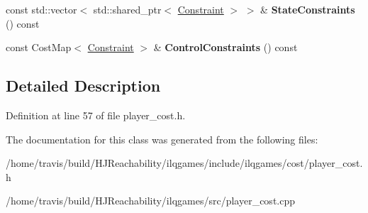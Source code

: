 \begin{DoxyCompactItemize}
\item 
const std\+::vector$<$ std\+::shared\+\_\+ptr$<$ \hyperlink{classilqgames_1_1_constraint}{Constraint} $>$ $>$ \& {\bfseries State\+Constraints} () const \hypertarget{classilqgames_1_1_player_cost_ac6ef894e71fd9524bd6aa6d3982f415a}{}\label{classilqgames_1_1_player_cost_ac6ef894e71fd9524bd6aa6d3982f415a}

\item 
const Cost\+Map$<$ \hyperlink{classilqgames_1_1_constraint}{Constraint} $>$ \& {\bfseries Control\+Constraints} () const \hypertarget{classilqgames_1_1_player_cost_acf0081bb561f71522cd9716a9e34eb60}{}\label{classilqgames_1_1_player_cost_acf0081bb561f71522cd9716a9e34eb60}

\end{DoxyCompactItemize}


\subsection{Detailed Description}


Definition at line 57 of file player\+\_\+cost.\+h.



The documentation for this class was generated from the following files\+:\begin{DoxyCompactItemize}
\item 
/home/travis/build/\+H\+J\+Reachability/ilqgames/include/ilqgames/cost/player\+\_\+cost.\+h\item 
/home/travis/build/\+H\+J\+Reachability/ilqgames/src/player\+\_\+cost.\+cpp\end{DoxyCompactItemize}
